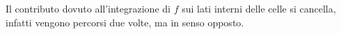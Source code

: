 \documentclass[preview]{standalone}
\begin{document}
\begin{center}
Il contributo dovuto all'integrazione di $f$ sui lati interni delle celle si cancella, infatti vengono percorsi due volte, ma in senso opposto.
\end{center}
\end{document}
